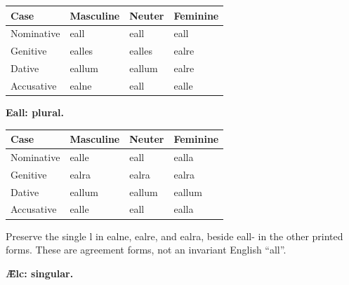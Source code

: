 \par\begingroup
\fontsize{10.5}{13.2}\selectfont
\setlength{\LTleft}{0pt}\setlength{\LTright}{\fill}
\noindent
\begin{tabular}{@{}>{\raggedright\arraybackslash}p{22.0mm}>{\raggedright\arraybackslash}p{31.188mm}>{\raggedright\arraybackslash}p{31.188mm}>{\raggedright\arraybackslash}p{31.188mm}@{}}
\toprule
\textbf{Case} & \textbf{Masculine} & \textbf{Neuter} & \textbf{Feminine} \\
\midrule
Nominative & eall & eall & eall \\
Genitive & ealles & ealles & ealre \\
Dative & eallum & eallum & ealre \\
Accusative & ealne & eall & ealle \\
\bottomrule
\end{tabular}
\par\endgroup
\textbf{Eall: plural.}

\par\begingroup
\fontsize{10.5}{13.2}\selectfont
\setlength{\LTleft}{0pt}\setlength{\LTright}{\fill}
\noindent
\begin{tabular}{@{}>{\raggedright\arraybackslash}p{22.0mm}>{\raggedright\arraybackslash}p{31.188mm}>{\raggedright\arraybackslash}p{31.188mm}>{\raggedright\arraybackslash}p{31.188mm}@{}}
\toprule
\textbf{Case} & \textbf{Masculine} & \textbf{Neuter} & \textbf{Feminine} \\
\midrule
Nominative & ealle & eall & ealla \\
Genitive & ealra & ealra & ealra \\
Dative & eallum & eallum & eallum \\
Accusative & ealle & eall & ealla \\
\bottomrule
\end{tabular}
\par\endgroup
Preserve the single l in ealne, ealre, and ealra, beside eall- in the other printed forms. These are agreement forms, not an invariant English “all”.

\textbf{Ǣlc: singular.}

